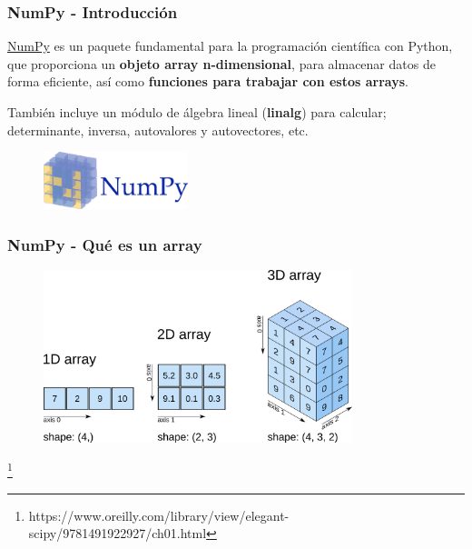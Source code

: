 \documentclass[18pt]{beamer}
\newcommand\blfootnote[1]{%
  \begingroup
  \renewcommand\thefootnote{}\footnote{#1}%
  \addtocounter{footnote}{-1}%
  \endgroup
}
\begin{document}
\begin{frame}

	\frametitle{NumPy - Introducción}

	\href{http://www.numpy.org/}{NumPy}
	es un paquete fundamental para la programación científica con Python,
	que proporciona un \textbf{objeto array n-dimensional}, para almacenar
	datos de forma eficiente, así como \textbf{funciones para trabajar con estos
	arrays}. 
	
	También incluye un módulo de álgebra lineal (\textbf{linalg}) para calcular; 
	determinante, inversa, autovalores y autovectores, etc.
	
	\vspace{0.4cm}
	
	\begin{figure}
		\includegraphics[width=4.2cm]{images/numpy.png}
	\end{figure}

\end{frame}


\begin{frame}
	
	\frametitle{NumPy - Qué es un array}
	
	\centering
	\begin{figure}
		\includegraphics[width=9cm]{images/numpy_array_t.png}
	\end{figure}
	
	\blfootnote{\scriptsize https://www.oreilly.com/library/view/elegant-scipy/9781491922927/ch01.html}
		
\end{frame}
\end{document}
